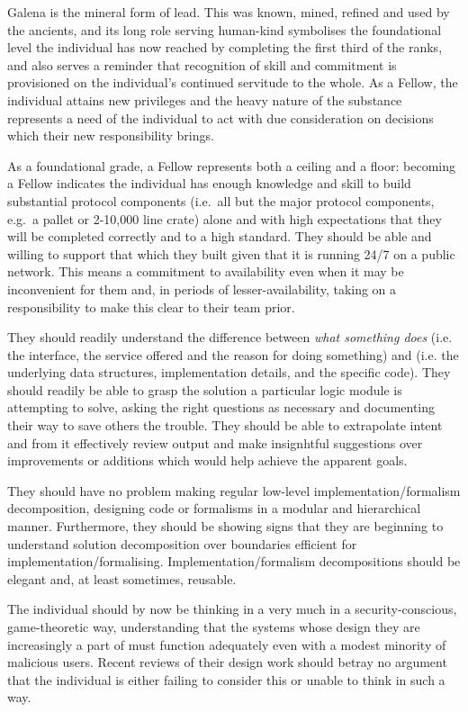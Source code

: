 \documentclass[9pt,oneside]{amsart}
\begin{document}
Galena is the mineral form of lead. This was known, mined, refined and used by the ancients, and its long role serving human-kind symbolises the foundational level the individual has now reached by completing the first third of the ranks, and also serves a reminder that recognition of skill and commitment is provisioned on the individual's continued servitude to the whole. As a Fellow, the individual attains new privileges and the heavy nature of the substance represents a need of the individual to act with due consideration on decisions which their new responsibility brings.

As a foundational grade, a Fellow represents both a ceiling and a floor: becoming a Fellow indicates the individual has enough knowledge and skill to build substantial protocol components (i.e.~all but the major protocol components, e.g.~a pallet or 2-10,000 line crate) alone and with high expectations that they will be completed correctly and to a high standard. They should be able and willing to support that which they built given that it is running 24/7 on a public network. This means a commitment to availability even when it may be inconvenient for them and, in periods of lesser-availability, taking on a responsibility to make this clear to their team prior.

They should readily understand the difference between \textit{what something does} (i.e. the interface, the service offered and the reason for doing something) and  (i.e. the underlying data structures, implementation details, and the specific code). They should readily be able to grasp the solution a particular logic module is attempting to solve, asking the right questions as necessary and documenting their way to save others the trouble. They should be able to extrapolate intent and from it effectively review output and make insignhtful suggestions over improvements or additions which would help achieve the apparent goals.

They should have no problem making regular low-level implementation/formalism decomposition, designing code or formalisms in a modular and hierarchical manner. Furthermore, they should be showing signs that they are beginning to understand solution decomposition over boundaries efficient for implementation/formalising. Implementation/formalism decompositions should be elegant and, at least sometimes, reusable.

The individual should by now be thinking in a very much in a security-conscious, game-theoretic way, understanding that the systems whose design they are increasingly a part of must function adequately even with a modest minority of malicious users. Recent reviews of their design work should betray no argument that the individual is either failing to consider this or unable to think in such a way.
\end{document}
